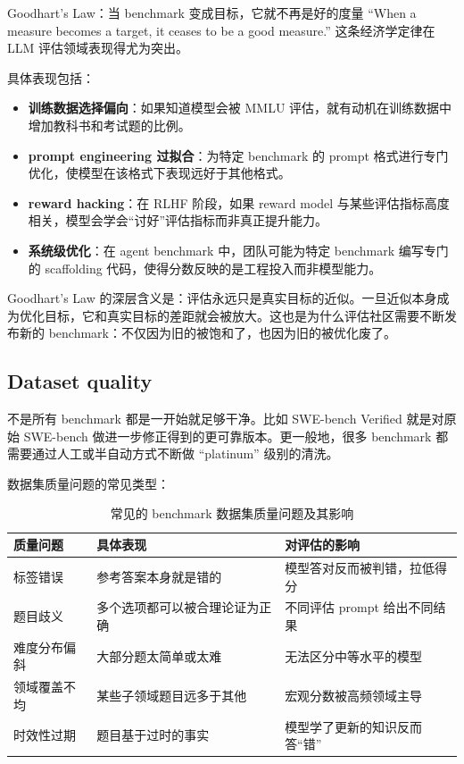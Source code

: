 \begin{warningbox}{Goodhart's Law：当 benchmark 变成目标，它就不再是好的度量}
``When a measure becomes a target, it ceases to be a good measure.'' 这条经济学定律在 LLM 评估领域表现得尤为突出。

具体表现包括：
\begin{itemize}
    \item \textbf{训练数据选择偏向}：如果知道模型会被 MMLU 评估，就有动机在训练数据中增加教科书和考试题的比例。
    \item \textbf{prompt engineering 过拟合}：为特定 benchmark 的 prompt 格式进行专门优化，使模型在该格式下表现远好于其他格式。
    \item \textbf{reward hacking}：在 RLHF 阶段，如果 reward model 与某些评估指标高度相关，模型会学会``讨好''评估指标而非真正提升能力。
    \item \textbf{系统级优化}：在 agent benchmark 中，团队可能为特定 benchmark 编写专门的 scaffolding 代码，使得分数反映的是工程投入而非模型能力。
\end{itemize}

Goodhart's Law 的深层含义是：评估永远只是真实目标的近似。一旦近似本身成为优化目标，它和真实目标的差距就会被放大。这也是为什么评估社区需要不断发布新的 benchmark：不仅因为旧的被饱和了，也因为旧的被优化废了。
\end{warningbox}

\subsection{Dataset quality}

不是所有 benchmark 都是一开始就足够干净。比如 SWE-bench Verified 就是对原始 SWE-bench 做进一步修正得到的更可靠版本。更一般地，很多 benchmark 都需要通过人工或半自动方式不断做 ``platinum'' 级别的清洗。

数据集质量问题的常见类型：

\begin{table}[H]
\centering
\begin{tabular}{p{3.0cm}p{4.5cm}p{5.5cm}}
\toprule
\textbf{质量问题} & \textbf{具体表现} & \textbf{对评估的影响} \\
\midrule
标签错误 & 参考答案本身就是错的 & 模型答对反而被判错，拉低得分 \\
题目歧义 & 多个选项都可以被合理论证为正确 & 不同评估 prompt 给出不同结果 \\
难度分布偏斜 & 大部分题太简单或太难 & 无法区分中等水平的模型 \\
领域覆盖不均 & 某些子领域题目远多于其他 & 宏观分数被高频领域主导 \\
时效性过期 & 题目基于过时的事实 & 模型学了更新的知识反而答``错'' \\
\bottomrule
\end{tabular}
\caption{常见的 benchmark 数据集质量问题及其影响}
\end{table}

